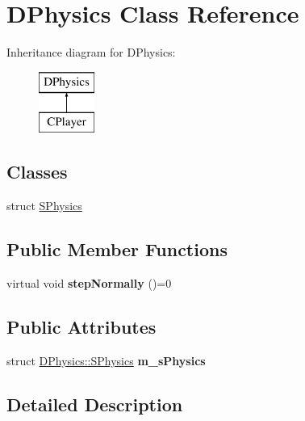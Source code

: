 \hypertarget{classDPhysics}{\section{D\-Physics Class Reference}
\label{classDPhysics}
}
Inheritance diagram for D\-Physics\-:\begin{figure}[H]
\begin{center}
\leavevmode
\includegraphics[height=2.000000cm]{classDPhysics}
\end{center}
\end{figure}
\subsection*{Classes}
\begin{DoxyCompactItemize}
\item 
struct \hyperlink{structDPhysics_1_1SPhysics}{S\-Physics}
\end{DoxyCompactItemize}
\subsection*{Public Member Functions}
\begin{DoxyCompactItemize}
\item 
\hypertarget{classDPhysics_a414316ffcec06dbf01ced086bbb92b55}{virtual void {\bfseries step\-Normally} ()=0}\label{classDPhysics_a414316ffcec06dbf01ced086bbb92b55}

\end{DoxyCompactItemize}
\subsection*{Public Attributes}
\begin{DoxyCompactItemize}
\item 
\hypertarget{classDPhysics_aca2940879481f0e2b892c82c5fc0da5a}{struct \hyperlink{structDPhysics_1_1SPhysics}{D\-Physics\-::\-S\-Physics} {\bfseries m\-\_\-s\-Physics}}\label{classDPhysics_aca2940879481f0e2b892c82c5fc0da5a}

\end{DoxyCompactItemize}


\subsection{Detailed Description}



